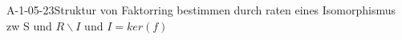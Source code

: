 
\begin{REM}{A-1-05-23}{Struktur von Faktorring bestimmen durch raten eines Isomorphismus zw S und $R\backslash I$ und $I=ker(f)$}
\end{REM}
